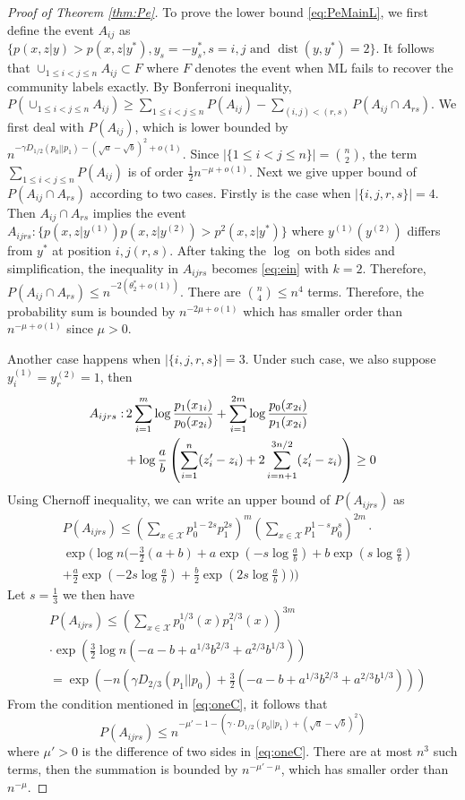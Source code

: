 \documentclass[conference]{IEEEtran}
\DeclareMathOperator{\dist}{dist}
\begin{document}
\begin{proof}[Proof of Theorem \ref{thm:Pe}]
To prove the lower bound \ref{eq:PeMainL}, we first
define the event $A_{ij}$ as $\{p(x,z|y) > p(x,z|y^*),y_s=-y^*_s, s=i,j \textrm{ and } \dist(y,y^*)=2  \}$.
It follows that $\cup_{1\leq i < j\leq n} A_{ij} \subset F$ where $F$ denotes the event when ML fails to recover the community labels exactly.
By Bonferroni inequality,
$P(\cup_{1\leq i < j\leq n} A_{ij}) \geq \sum_{1\leq i < j\leq n} P(A_{ij}) - \sum_{(i,j) < (r,s) } P(A_{ij} \cap A_{rs})$.
We first deal with $P(A_{ij})$, which is lower bounded by $n^{-\gamma D_{1/2}(p_0 || p_1)-(\sqrt{a} - \sqrt{b})^2 +o(1)}$. Since $|\{1\leq i < j\leq n\}|=\binom{n}{2}$, the term $\sum_{1\leq i < j\leq n} P(A_{ij})$ is of order $\frac{1}{2}n^{-\mu+o(1)}$.
Next we give upper bound of $P(A_{ij} \cap A_{rs})$ according to two cases.
Firstly is the case when $|\{i,j,r,s\}|=4$. Then $A_{ij} \cap A_{rs}$ implies the event
$A_{ijrs}: \{p(x,z|y^{(1)})p(x,z|y^{(2)}) > p^2(x,z|y^*)\}$ where $y^{(1)}(y^{(2)})$ differs from $y^*$ at position $i,j(r,s)$.
After taking the $\log$ on both sides and simplification, the inequality in $A_{ijrs}$ becomes \eqref{eq:ein}  with $k=2$.
Therefore, $P(A_{ij} \cap A_{rs}) \leq n^{-2(\theta^*_2 + o(1))} $. There are
$\binom{n}{4} \leq n^4$ terms. Therefore, the probability sum
is bounded by $n^{-2\mu +o(1)}$ which has smaller order than $n^{-\mu+o(1)}$ since $\mu > 0$.

Another case happens when $|\{i,j,r,s\}|=3$. Under such case, we also suppose $y^{(1)}_i = y^{(2)}_r = 1$, then
\begin{align}
A_{ijrs}: &\, 2\sum_{i=1}^m  \log \frac{p_1(x_{1i})}{p_0(x_{2i})}
+ \sum_{i=1}^{2m} \log \frac{p_0(x_{2i})}{p_1(x_{2i})} \\
& +\log\frac{a}{b}\left(
\sum_{i=1}^{n} (z'_i - z_i) + 2\sum_{i=n+1}^{3n/2} (z'_i - z_i)\right)  \geq 0\notag
\end{align}
Using Chernoff inequality, we can write an upper bound of $P(A_{ijrs})$ as
\begin{align*}
&P(A_{ijrs}) \leq  (\sum_{x\in \mathcal{X}} p_0^{1-2s}p_1^{2s})^m (\sum_{x\in \mathcal{X}} p_1^{1-s}p_0^{s})^{2m} \cdot \\
&\exp(\log n (-\frac{3}{2}(a+b)+a\exp(-s\log \frac{a}{b})+b\exp(s\log \frac{a}{b}) \\
&+ \frac{a}{2}\exp(-2s\log \frac{a}{b})+\frac{b}{2}\exp(2s\log \frac{a}{b})))
\end{align*}
Let $s=\frac{1}{3}$ we then have
\begin{align*}
&P(A_{ijrs})\leq  (\sum_{x\in \mathcal{X}} p_0^{1/3}(x)p_1^{2/3}(x))^{3m}\\
& \cdot \exp(\frac{3}{2}\log n (-a-b+a^{1/3}b^{2/3}+a^{2/3}b^{1/3})) \\
&=  \exp(-n(\gamma D_{2/3}(p_1 || p_0) + \frac{3}{2} (-a-b+a^{1/3}b^{2/3}+a^{2/3}b^{1/3})))
\end{align*}
From the condition mentioned in \eqref{eq:oneC},
it follows that
$$
P(A_{ijrs}) \leq n^{-\mu'-1-(\gamma \cdot D_{1/2}(p_0||p_1) + (\sqrt{a} - \sqrt{b})^2)}
$$
where $\mu'>0$ is the difference of two sides in \eqref{eq:oneC}. 
There are at most $n^3$ such terms, then the summation is bounded by
$n^{-\mu'-\mu }$,
which has smaller order than $n^{-\mu}$.


\end{proof}
\end{document}
